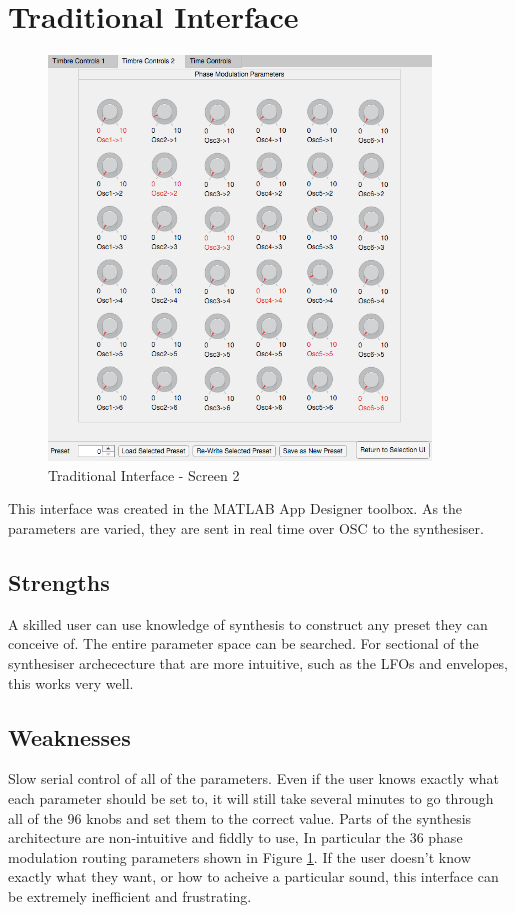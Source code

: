 \documentclass[11pt, oneside]{report}   	%
\begin{document}
\section{Traditional Interface}
\begin{figure}
		\vspace{-30pt}
	\includegraphics[width = 4in]{TraditionalUI2.png}
	\caption{Traditional Interface - Screen 2}
	\label{fig:TraditionalInterface2}
	\vspace{-60pt}
\end{figure}
This interface was created in the MATLAB App Designer toolbox. As the parameters are varied, they are sent in real time over OSC to the synthesiser.
\subsection{Strengths}
A skilled user can use knowledge of synthesis to construct any preset they can conceive of. The entire parameter space can be searched. For sectional of the synthesiser archececture that are more intuitive, such as the LFOs and envelopes, this works very well.
\subsection{Weaknesses}
Slow serial control of all of the parameters. Even if the user knows exactly what each parameter should be set to, it will still take several minutes to go through all of the 96 knobs and set them to the correct value. Parts of the synthesis architecture are non-intuitive and fiddly to use, In particular the 36 phase modulation routing parameters shown in Figure \ref{fig:TraditionalInterface2}. If the user doesn't know exactly what they want, or how to acheive a particular sound, this interface can be extremely inefficient and frustrating.
\end{document}
